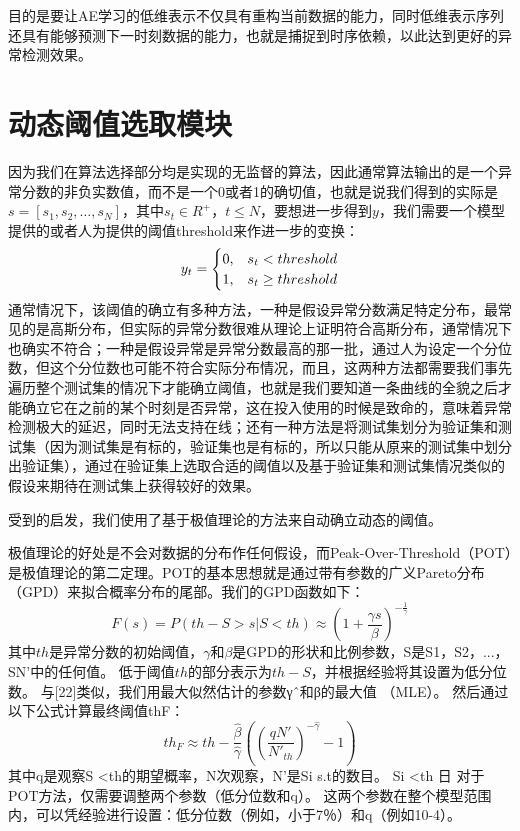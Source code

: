 目的是要让AE学习的低维表示不仅具有重构当前数据的能力，同时低维表示序列还具有能够预测下一时刻数据的能力，也就是捕捉到时序依赖，以此达到更好的异常检测效果。

\section{动态阈值选取模块}
因为我们在算法选择部分均是实现的无监督的算法，因此通常算法输出的是一个异常分数的非负实数值，而不是一个0或者1的确切值，也就是说我们得到的实际是$s = [s_1, s_2,\dots,s_N]$，其中$s_t\in R^+$，$t\leq N$，要想进一步得到$y$，我们需要一个模型提供的或者人为提供的阈值threshold来作进一步的变换：
\begin{equation}
  y_t = \begin{cases}
    0, & s_t < threshold \cr
    1, & s_t \geq threshold
  \end{cases}
\end{equation}
通常情况下，该阈值的确立有多种方法，一种是假设异常分数满足特定分布，最常见的是高斯分布，但实际的异常分数很难从理论上证明符合高斯分布，通常情况下也确实不符合；一种是假设异常是异常分数最高的那一批，通过人为设定一个分位数，但这个分位数也可能不符合实际分布情况，而且，这两种方法都需要我们事先遍历整个测试集的情况下才能确立阈值，也就是我们要知道一条曲线的全貌之后才能确立它在之前的某个时刻是否异常，这在投入使用的时候是致命的，意味着异常检测极大的延迟，同时无法支持在线；还有一种方法是将测试集划分为验证集和测试集（因为测试集是有标的，验证集也是有标的，所以只能从原来的测试集中划分出验证集），通过在验证集上选取合适的阈值以及基于验证集和测试集情况类似的假设来期待在测试集上获得较好的效果。

受到\cite{siffer2017anomaly}的启发，我们使用了基于极值理论的方法来自动确立动态的阈值。

极值理论的好处是不会对数据的分布作任何假设，而Peak-Over-Threshold（POT）是极值理论的第二定理。POT的基本思想就是通过带有参数的广义Pareto分布（GPD）来拟合概率分布的尾部。我们的GPD函数如下：
\begin{equation}
  F(s) = P(th - S > s | S < th) \approx (1 + \frac{\gamma s}{\beta})^{-\frac{1}{\gamma}}
\end{equation}
其中$th$是异常分数的初始阈值，$\gamma$和$\beta$是GPD的形状和比例参数，S是{S1，S2，...，SN'}中的任何值。 低于阈值$th$的部分表示为$th-S$，并根据经验将其设置为低分位数。 与[22]类似，我们用最大似然估计的参数γˆ和β的最大值
（MLE）。 然后通过以下公式计算最终阈值thF：
\begin{equation}
  th_F \approx th - \frac{\hat{\beta}}{\hat{\gamma}}((\frac{qN'}{N'_{th}})^{-\hat{\gamma}}-1)
\end{equation}
其中q是观察S <th的期望概率，N次观察，N'是Si s.t的数目。 Si <th
日
对于POT方法，仅需要调整两个参数（低分位数和q）。 这两个参数在整个模型范围内，可以凭经验进行设置：低分位数（例如，小于7％）和q（例如10-4）\cite{siffer2017anomaly}。

